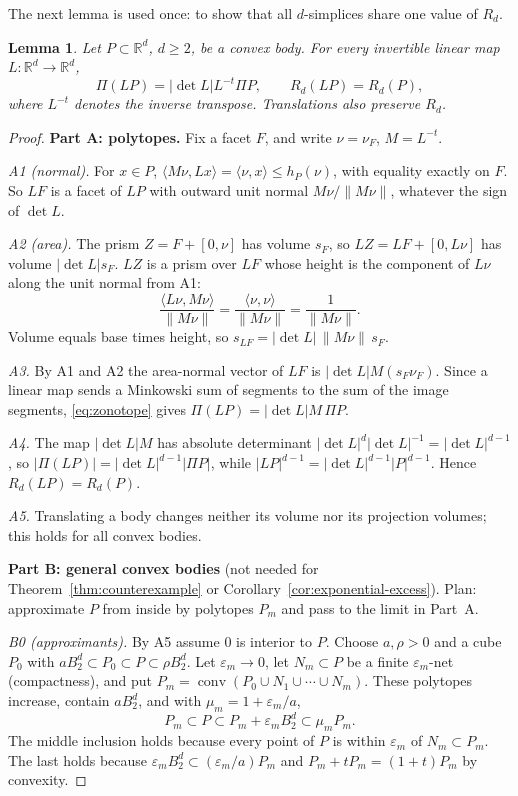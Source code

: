 \documentclass[11pt]{article}
\newtheorem{lemma}[theorem]{Lemma}
\newcommand{\R}{\mathbb R}
\DeclareMathOperator{\conv}{conv}
\begin{document}
The next lemma is used once: to show that all \(d\)-simplices share one value of \(R_d\).

\begin{lemma}\label{lem:affine}
Let \(P\subset\R^d\), \(d\ge2\), be a convex body. For every invertible linear map \(L\colon\R^d\to\R^d\),
\[
 \Pi(LP)=|\det L|L^{-t}\Pi P,\qquad R_d(LP)=R_d(P),
\]
where \(L^{-t}\) denotes the inverse transpose. Translations also preserve \(R_d\).
\end{lemma}

\begin{proof}
\textbf{Part A: polytopes.} Fix a facet \(F\), and write \(\nu=\nu_F\), \(M=L^{-t}\).

\emph{A1 (normal).} For \(x\in P\), \(\langle M\nu,Lx\rangle=\langle\nu,x\rangle\le h_P(\nu)\), with equality exactly on \(F\). So \(LF\) is a facet of \(LP\) with outward unit normal \(M\nu/\|M\nu\|\), whatever the sign of \(\det L\).

\emph{A2 (area).} The prism \(Z=F+[0,\nu]\) has volume \(s_F\), so \(LZ=LF+[0,L\nu]\) has volume \(|\det L|s_F\). \(LZ\) is a prism over \(LF\) whose height is the component of \(L\nu\) along the unit normal from A1:
\[
 \frac{\langle L\nu,M\nu\rangle}{\|M\nu\|}=\frac{\langle\nu,\nu\rangle}{\|M\nu\|}=\frac1{\|M\nu\|}.
\]
Volume equals base times height, so \(s_{LF}=|\det L|\,\|M\nu\|\,s_F\).

\emph{A3.} By A1 and A2 the area-normal vector of \(LF\) is \(|\det L|M(s_F\nu_F)\). Since a linear map sends a Minkowski sum of segments to the sum of the image segments, \eqref{eq:zonotope} gives \(\Pi(LP)=|\det L|M\,\Pi P\).

\emph{A4.} The map \(|\det L|M\) has absolute determinant \(|\det L|^d|\det L|^{-1}=|\det L|^{d-1}\), so \(|\Pi(LP)|=|\det L|^{d-1}|\Pi P|\), while \(|LP|^{d-1}=|\det L|^{d-1}|P|^{d-1}\). Hence \(R_d(LP)=R_d(P)\).

\emph{A5.} Translating a body changes neither its volume nor its projection volumes; this holds for all convex bodies.

\textbf{Part B: general convex bodies} (not needed for Theorem~\ref{thm:counterexample} or Corollary~\ref{cor:exponential-excess}). Plan: approximate \(P\) from inside by polytopes \(P_m\) and pass to the limit in Part~A.

\emph{B0 (approximants).} By A5 assume \(0\) is interior to \(P\). Choose \(a,\rho>0\) and a cube \(P_0\) with \(aB_2^d\subset P_0\subset P\subset\rho B_2^d\). Let \(\varepsilon_m\to0\), let \(N_m\subset P\) be a finite \(\varepsilon_m\)-net (compactness), and put \(P_m=\conv(P_0\cup N_1\cup\cdots\cup N_m)\). These polytopes increase, contain \(aB_2^d\), and with \(\mu_m=1+\varepsilon_m/a\),
\[
 P_m\subset P\subset P_m+\varepsilon_mB_2^d\subset\mu_mP_m .
\]
The middle inclusion holds because every point of \(P\) is within \(\varepsilon_m\) of \(N_m\subset P_m\). The last holds because \(\varepsilon_mB_2^d\subset(\varepsilon_m/a)P_m\) and \(P_m+tP_m=(1+t)P_m\) by convexity.


\end{proof}
\end{document}
